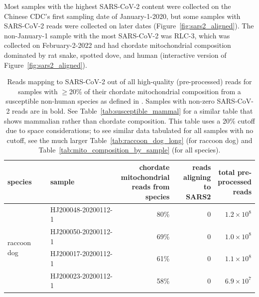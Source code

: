 \documentclass[9pt,twocolumn,twoside]{gsajnl_modified}
\begin{document}
Most samples with the highest SARS-CoV-2 content were collected on the Chinese CDC's first sampling date of January-1-2020, but some samples with SARS-CoV-2 reads were collected on later dates (Figure~\ref{fig:sars2_aligned}).
The non-January-1 sample with the most SARS-CoV-2 was RLC-3, which was collected on February-2-2022 and had chordate mitochondrial composition dominated by rat snake, spotted dove, and human (interactive version of Figure~\ref{fig:sars2_aligned}).

\begin{table}
\caption{
Reads mapping to SARS-CoV-2 out of all high-quality (pre-processed) reads for samples with $\ge$20\% of their chordate mitochondrial composition from a susceptible non-human species as defined in \citet{crits2023genetic}.
Samples with non-zero SARS-CoV-2 reads are in bold.
See Table~\ref{tab:susceptible_mammal} for a similar table that shows mammalian rather than chordate composition.
This table uses a 20\% cutoff due to space considerations; to see similar data tabulated for all samples with no cutoff, see the much larger Table~\ref{tab:raccoon_dog_long} (for raccoon dog) and Table~\ref{tab:mito_composition_by_sample} (for all species).
\label{tab:susceptible}
}
{\scriptsize
\setlength{\tabcolsep}{5pt}
\renewcommand{\arraystretch}{1.3}
\begin{tabular}{llrrr}
\toprule
species      &   sample              & \makecell[r]{chordate \\ mitochondrial \\ reads from \\ species} &  \makecell[r]{reads \\ aligning \\ to SARS2} & \makecell[r]{ total pre-\\processed \\ reads} \\ 
\midrule
\multirow{14}{*}{raccoon dog} & HJ200048-20200112-1 &                                80\% &                        0 &                   $1.2\times 10^8$ \\
                 & HJ200050-20200112-1 &                                69\% &                        0 &                     $1.0 \times 10^8$ \\
                 & HJ200017-20200112-1 &                                61\% &                        0 &                   $1.1 \times 10^8$ \\
                 & HJ200023-20200112-1 &                                58\% &                        0 &                   $6.9 \times 10^7$ \\

\end{tabular}}
\end{table}
\end{document}
